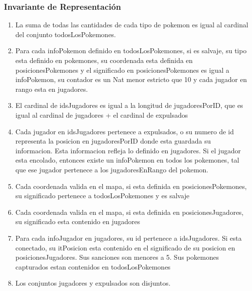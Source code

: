 \begin{Representacion}
\subsubsection{Invariante de Representación}
	\begin{enumerate}
		\item La suma de todas las cantidades de cada tipo de pokemon es igual al cardinal del conjunto todosLosPokemones.
		\item Para cada infoPokemon definido en todosLosPokemones, si es salvaje, su tipo esta definido en pokemones, su coordenada esta definida en posicionesPokemones y el significado en posicionesPokemones es igual a infoPokemon, su contador es un Nat menor estricto que 10 y cada jugador en rango esta en jugadores.
		\item El cardinal de idsJugadores es igual a la longitud de jugadoresPorID, que es igual al cardinal de jugadores + el cardinal de expulsados
		\item Cada jugador en idsJugadores pertenece a expulsados, o su numero de id representa la posicion en jugadoresPorID donde esta guardada su informacion. Esta informacion refleja lo definido en jugadores. Si el jugador esta encolado, entonces existe un infoPokemon en todos los pokemones, tal que ese jugador pertenece a los jugadoresEnRango del pokemon.
		\item Cada coordenada valida en el mapa, si esta definida en posicionesPokemones, su significado pertenece a todosLosPokemones y es salvaje		
		\item Cada coordenada valida en el mapa, si esta definida en posicionesJugadores, su significado esta contenido en jugadores
		\item Para cada infoJugador en jugadores, su id pertenece a idsJugadores. Si esta conectado, su itPosicion esta contenido en el significado de su posicion en posicionesJugadores. Sus sanciones son menores a 5. Sus pokemones capturados estan contenidos en todosLosPokemones
		\item Los conjuntos jugadores y expulsados son disjuntos.
	\end{enumerate}
	

\end{Representacion}
